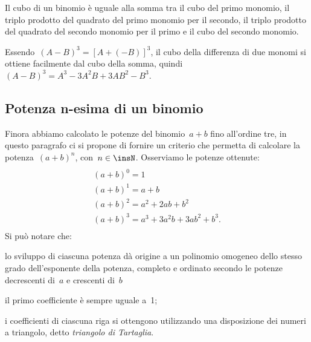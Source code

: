 \osservazione Il cubo di un binomio è uguale alla somma tra il
cubo del primo monomio, il triplo prodotto del quadrato del primo
monomio per il secondo, il triplo prodotto del quadrato del secondo
monomio per il primo e il cubo del secondo monomio.

Essendo~\(\left(A-B\right)^{3}=\left[A+\left(-B\right)\right]^{3}\), il
cubo della differenza di due monomi si ottiene facilmente dal cubo
della somma, quindi
\(\left(A-B\right)^{3}=A^{3}-3A^{2}B+3{AB}^{2}-B^{3}\).


\subsection{Potenza n-esima di un binomio}
\label{subsec:11_prodnot_potenzabinomio}

Finora abbiamo calcolato le potenze del binomio~\(a+b\) fino
all'ordine tre, in questo paragrafo ci si propone di
fornire un criterio che permetta di calcolare la potenza~\((a+b)^{n}\),
con~\(n\in \insN\). Osserviamo le potenze ottenute:
\begin{multline*}
\\(a+b)^{0}=1\\
(a+b)^{1}=a+b\\
(a+b)^{2}=a^{2}+2{ab}+b^{2}\\
(a+b)^{3}=a^{3}+3a^{2}b+3{ab}^{2}+b^{3}.\\
\end{multline*}
Si può notare che:

\begin{itemize*}
\item lo sviluppo di ciascuna potenza dà origine a un polinomio
omogeneo dello stesso grado dell'esponente della
potenza, completo e ordinato secondo le potenze decrescenti di~\(a\) e 
crescenti di~\(b\)
\item il primo coefficiente è sempre uguale a~1;
\item i coefficienti di ciascuna riga si ottengono utilizzando una
disposizione dei numeri a triangolo, detto \emph{triangolo di Tartaglia}.
\end{itemize*}

\begin{inaccessibleblock}
\begin{minipage}[t]{.49\textwidth}
 \centering 
\end{minipage}
\hfil
 \begin{minipage}[t]{.49\textwidth}
 \centering 
\end{minipage}
\end{inaccessibleblock}

